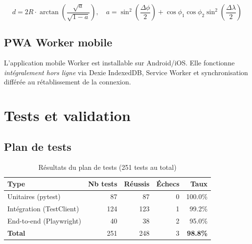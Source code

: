 \begin{equation}
d = 2R \cdot \arctan\!\left(\frac{\sqrt{a}}{\sqrt{1-a}}\right), \quad
a = \sin^2\!\!\left(\frac{\Delta\phi}{2}\right) + \cos\phi_1 \cos\phi_2 \sin^2\!\!\left(\frac{\Delta\lambda}{2}\right)
\label{eq:haversine}
\end{equation}

\subsection{PWA Worker mobile}

L'application mobile Worker est installable sur Android/iOS.
Elle fonctionne \textit{intégralement hors ligne} via Dexie IndexedDB,
Service Worker et synchronisation différée au rétablissement de la connexion.

\section{Tests et validation}

\subsection{Plan de tests}

\begin{table}[H]
\centering
\caption{Résultats du plan de tests (251 tests au total)}
\label{tab:tests}
\begin{tabular}{lrrrr}
\toprule
\textbf{Type} & \textbf{Nb tests} & \textbf{Réussis} & \textbf{Échecs} & \textbf{Taux} \\
\midrule
Unitaires (pytest)     & 87  & 87  & 0 & 100.0\% \\
Intégration (TestClient) & 124 & 123 & 1 & 99.2\% \\
End-to-end (Playwright) & 40  & 38  & 2 & 95.0\% \\
\midrule
\textbf{Total}          & 251 & 248 & 3 & \textbf{98.8\%} \\
\bottomrule
\end{tabular}
\end{table}

